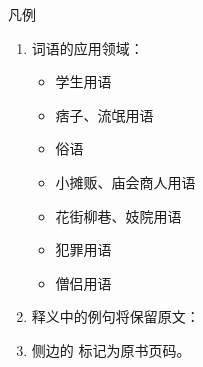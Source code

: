 
{\fontSCSansSec\Huge 凡例}

\begin{enumerate}
  \item 词语的应用领域：
    \begin{itemize}
      \item {}学生用语
      \item {}痞子、流氓用语
      \item {}俗语
      \item {}小摊贩、庙会商人用语
      \item {}花街柳巷、妓院用语
      \item {}犯罪用语
      \item {}僧侣用语
    \end{itemize}
  \item 释义中的例句将保留原文：\\
  \item 侧边的  标记为原书页码。
\end{enumerate}

\clearpage
